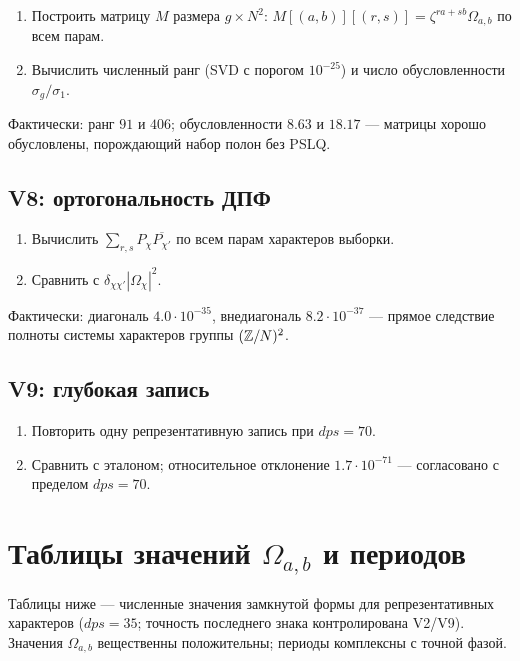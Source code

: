 \begin{enumerate}[leftmargin=2em, itemsep=0.1em]
\item Построить матрицу $M$ размера $g\times N^2$:
  $M[(a,b)][(r,s)]=\zeta^{ra+sb}\Omega_{a,b}$ по всем парам.
\item Вычислить численный ранг (SVD с порогом $10^{-25}$) и число
  обусловленности $\sigma_g/\sigma_1$.
\end{enumerate}
Фактически: ранг $91$ и $406$; обусловленности $8.63$ и $18.17$ ---
матрицы хорошо обусловлены, порождающий набор полон без PSLQ.

\subsection{V8: ортогональность ДПФ}

\begin{enumerate}[leftmargin=2em, itemsep=0.1em]
\item Вычислить $\sum_{r,s}P_\chi\overline{P_{\chi'}}$ по всем парам
  характеров выборки.
\item Сравнить с $\delta_{\chi\chi'}|\Omega_\chi|^2$.
\end{enumerate}
Фактически: диагональ $4.0\cdot10^{-35}$, внедиагональ
$8.2\cdot10^{-37}$ --- прямое следствие полноты системы характеров
группы $(\mathbb{Z}/N)^2$.

\subsection{V9: глубокая запись}

\begin{enumerate}[leftmargin=2em, itemsep=0.1em]
\item Повторить одну репрезентативную запись при $dps=70$.
\item Сравнить с эталоном; относительное отклонение $1.7\cdot10^{-71}$
  --- согласовано с пределом $dps=70$.
\end{enumerate}

\section{Таблицы значений $\Omega_{a,b}$ и периодов}\label{sec:periodtables}

Таблицы ниже --- численные значения замкнутой формы для
репрезентативных характеров ($dps=35$; точность последнего знака
контролирована V2/V9). Значения $\Omega_{a,b}$ вещественны
положительны; периоды комплексны с точной фазой.

